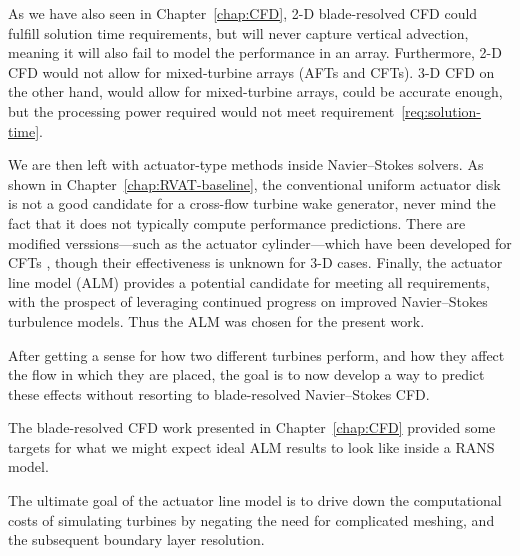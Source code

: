 As we have also seen in Chapter~\ref{chap:CFD}, 2-D blade-resolved CFD could
fulfill solution time requirements, but will never capture vertical advection,
meaning it will also fail to model the performance in an array. Furthermore, 2-D
CFD would not allow for mixed-turbine arrays (AFTs and CFTs). 3-D CFD on the
other hand, would allow for mixed-turbine arrays, could be accurate enough, but
the processing power required would not meet
requirement~\ref{req:solution-time}.

We are then left with actuator-type methods inside Navier--Stokes solvers. As
shown in Chapter~\ref{chap:RVAT-baseline}, the conventional uniform actuator
disk is not a good candidate for a cross-flow turbine wake generator, never mind
the fact that it does not typically compute performance predictions. There are
modified verssions---such as the actuator cylinder---which have been developed
for CFTs \cite{Shamsoddin2014}, though their effectiveness is unknown for 3-D
cases. Finally, the actuator line model (ALM) provides a potential candidate for
meeting all requirements, with the prospect of leveraging continued progress on
improved Navier--Stokes turbulence models. Thus the ALM was chosen for the
present work.

After getting a sense for how two different turbines perform, and how they
affect the flow in which they are placed, the goal is to now develop a way to
predict these effects without resorting to blade-resolved Navier--Stokes CFD.

The blade-resolved CFD work presented in Chapter~\ref{chap:CFD} provided some
targets for what we might expect ideal ALM results to look like inside a RANS
model.

The ultimate goal of the actuator line model is to drive down the computational
costs of simulating turbines by negating the need for complicated meshing, and
the subsequent boundary layer resolution.

